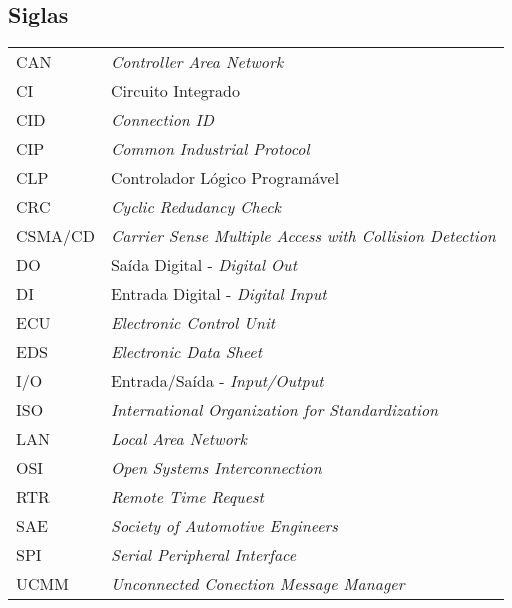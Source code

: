 


\subsection*{Siglas}

\begin{tabular}{p{}p{}}
CAN & \textit{Controller Area Network}\tabularnewline
CI & Circuito Integrado \tabularnewline
CID & \textit{Connection ID} \tabularnewline
CIP & \textit{Common Industrial Protocol} \tabularnewline
CLP  & Controlador Lógico Programável\tabularnewline
CRC & \textit{Cyclic Redudancy Check}\tabularnewline
CSMA/CD & \textit{Carrier Sense Multiple Access with Collision Detection}\tabularnewline
DO & Saída Digital - \textit{Digital Out}\tabularnewline
DI & Entrada Digital - \textit{Digital Input}\tabularnewline
ECU & \textit{Electronic Control Unit}\tabularnewline
EDS & \textit{Electronic Data Sheet}\tabularnewline
I/O & Entrada/Saída - \textit{Input/Output}\tabularnewline
ISO & \textit{International Organization for Standardization}\tabularnewline
LAN & \textit{Local Area Network}\tabularnewline
OSI & \textit{Open Systems Interconnection}\tabularnewline
RTR & \textit{Remote Time Request}\tabularnewline
SAE & \textit{Society of Automotive Engineers}\tabularnewline
SPI & \textit{ Serial Peripheral Interface}\tabularnewline
UCMM & \textit{Unconnected Conection Message Manager}\tabularnewline
\end{tabular}
